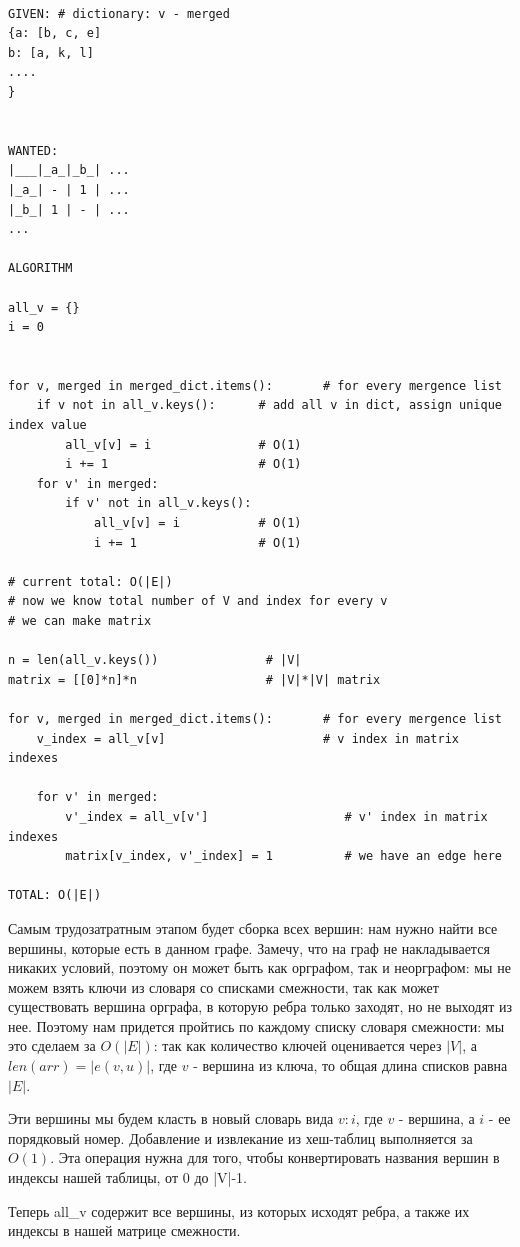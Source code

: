 \documentclass{article}
\begin{document}
\begin{verbatim}

GIVEN: # dictionary: v - merged
{a: [b, c, e]
b: [a, k, l]
....
}


WANTED:
|___|_a_|_b_| ...
|_a_| - | 1 | ...
|_b_| 1 | - | ...
...

ALGORITHM

all_v = {}
i = 0


for v, merged in merged_dict.items():       # for every mergence list
    if v not in all_v.keys():      # add all v in dict, assign unique index value
        all_v[v] = i               # O(1)
        i += 1                     # O(1)
    for v' in merged:
        if v' not in all_v.keys():
            all_v[v] = i           # O(1)
            i += 1                 # O(1)

# current total: O(|E|)
# now we know total number of V and index for every v
# we can make matrix

n = len(all_v.keys())               # |V|
matrix = [[0]*n]*n                  # |V|*|V| matrix 

for v, merged in merged_dict.items():       # for every mergence list
    v_index = all_v[v]                      # v index in matrix indexes

    for v' in merged:
        v'_index = all_v[v']                   # v' index in matrix indexes
        matrix[v_index, v'_index] = 1          # we have an edge here
        
TOTAL: O(|E|)
\end{verbatim}

Самым трудозатратным этапом будет сборка всех вершин: нам нужно найти все вершины, которые есть в данном графе. Замечу, что на граф не накладывается никаких условий, поэтому он может быть как орграфом, так и неорграфом: мы не можем взять ключи из словаря со списками смежности, так как может существовать вершина орграфа, в которую ребра только заходят, но не выходят из нее. Поэтому нам придется пройтись по каждому списку словаря смежности: мы это сделаем за $O(|E|)$: так как количество ключей оценивается через $|V|$, а $len(arr) = |e(v,u)|$, где $v$ - вершина из ключа, то общая длина списков равна $|E|$. 

Эти вершины мы будем класть в новый словарь вида $v: i$, где $v$ - вершина, а $i$ - ее порядковый номер. Добавление и извлекание из хеш-таблиц выполняется за $O(1)$. Эта операция нужна для того, чтобы конвертировать названия вершин в индексы нашей таблицы, от 0 до |V|-1. 

Теперь all\_v содержит все вершины, из которых исходят ребра, а также их индексы в нашей матрице смежности.
\end{document}
